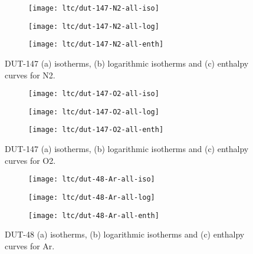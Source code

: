 \begin{figure}[htb]
    \centering
    \begin{subfigure}{0.33\linewidth}
        \texttt{[image: ltc/dut-147-N2-all-iso]}%
        \caption{}
    \end{subfigure}%
    \begin{subfigure}{0.33\linewidth}
        \texttt{[image: ltc/dut-147-N2-all-log]}%
        \caption{}
    \end{subfigure}%
    \begin{subfigure}{0.33\linewidth}
        \texttt{[image: ltc/dut-147-N2-all-enth]}%
        \caption{}
    \end{subfigure}%
    \caption{DUT-147 (a) isotherms, (b) logarithmic isotherms and 
    (c) enthalpy curves for N2.}%
    \label{appx:dut:fig:dut-147-N2-ltc}
\end{figure}

\begin{figure}[htb]
    \centering
    \begin{subfigure}{0.33\linewidth}
        \texttt{[image: ltc/dut-147-O2-all-iso]}%
        \caption{}
    \end{subfigure}%
    \begin{subfigure}{0.33\linewidth}
        \texttt{[image: ltc/dut-147-O2-all-log]}%
        \caption{}
    \end{subfigure}%
    \begin{subfigure}{0.33\linewidth}
        \texttt{[image: ltc/dut-147-O2-all-enth]}%
        \caption{}
    \end{subfigure}%
    \caption{DUT-147 (a) isotherms, (b) logarithmic isotherms and 
    (c) enthalpy curves for O2.}%
    \label{appx:dut:fig:dut-147-O2-ltc}
\end{figure}

\begin{figure}[htb]
    \centering
    \begin{subfigure}{0.33\linewidth}
        \texttt{[image: ltc/dut-48-Ar-all-iso]}%
        \caption{}
    \end{subfigure}%
    \begin{subfigure}{0.33\linewidth}
        \texttt{[image: ltc/dut-48-Ar-all-log]}%
        \caption{}
    \end{subfigure}%
    \begin{subfigure}{0.33\linewidth}
        \texttt{[image: ltc/dut-48-Ar-all-enth]}%
        \caption{}
    \end{subfigure}%
    \caption{DUT-48 (a) isotherms, (b) logarithmic isotherms and 
    (c) enthalpy curves for Ar.}%
    \label{appx:dut:fig:dut-48-Ar-ltc}
\end{figure}

